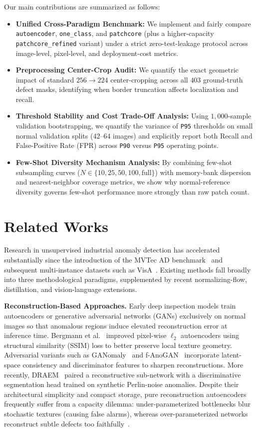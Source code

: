 \documentclass[conference]{IEEEtran}
\begin{document}
Our main contributions are summarized as follows:
\begin{itemize}
    \item \textbf{Unified Cross-Paradigm Benchmark:} We implement and fairly compare \texttt{autoencoder}, \texttt{one\_class}, and \texttt{patchcore} (plus a higher-capacity \texttt{patchcore\_refined} variant) under a strict zero-test-leakage protocol across image-level, pixel-level, and deployment-cost metrics.
    \item \textbf{Preprocessing Center-Crop Audit:} We quantify the exact geometric impact of standard $256 \rightarrow 224$ center-cropping across all $403$ ground-truth defect masks, identifying when border truncation affects localization and recall.
    \item \textbf{Threshold Stability and Cost Trade-Off Analysis:} Using $1{,}000$-sample validation bootstrapping, we quantify the variance of \texttt{P95} thresholds on small normal validation splits ($42$--$64$ images) and explicitly report both Recall and False-Positive Rate (FPR) across \texttt{P90} versus \texttt{P95} operating points.
    \item \textbf{Few-Shot Diversity Mechanism Analysis:} By combining few-shot subsampling curves ($N \in \{10, 25, 50, 100, \text{full}\}$) with memory-bank dispersion and nearest-neighbor coverage metrics, we show why normal-reference diversity governs few-shot performance more strongly than raw patch count.
\end{itemize}

\section{Related Works}
Research in unsupervised industrial anomaly detection has accelerated substantially since the introduction of the MVTec AD benchmark~\cite{bergmann2019mvtec,bergmann2021mvtec} and subsequent multi-instance datasets such as VisA~\cite{zou2022spot}. Existing methods fall broadly into three methodological paradigms, supplemented by recent normalizing-flow, distillation, and vision-language extensions.

\textbf{Reconstruction-Based Approaches.} Early deep inspection models train autoencoders or generative adversarial networks (GANs) exclusively on normal images so that anomalous regions induce elevated reconstruction error at inference time. Bergmann et al.~\cite{bergmann2019ssim} improved pixel-wise $\ell_2$ autoencoders using structural similarity (SSIM) loss to better preserve local texture geometry. Adversarial variants such as GANomaly~\cite{akcay2018ganomaly} and f-AnoGAN~\cite{schlegl2019fanogan} incorporate latent-space consistency and discriminator features to sharpen reconstructions. More recently, DRAEM~\cite{zavrtanik2021draem} paired a reconstructive sub-network with a discriminative segmentation head trained on synthetic Perlin-noise anomalies. Despite their architectural simplicity and compact storage, pure reconstruction autoencoders frequently suffer from a capacity dilemma: under-parameterized bottlenecks blur stochastic textures (causing false alarms), whereas over-parameterized networks reconstruct subtle defects too faithfully~\cite{bergmann2019mvtec}.
\end{document}
